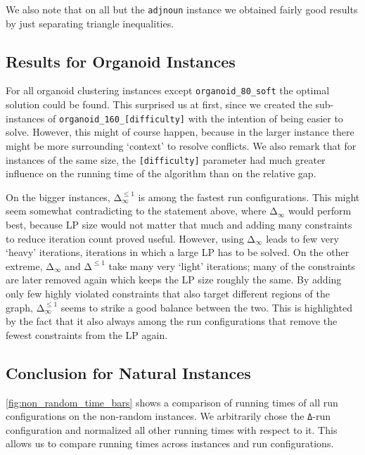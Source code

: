 We also note that on all but the \texttt{adjnoun} instance we obtained fairly good results by just separating triangle inequalities.

\subsection{Results for Organoid Instances}
For all organoid clustering instances except \texttt{organoid\_80\_soft} the optimal solution could be found.
This surprised us at first, since we created the sub-instances of \texttt{organoid\_160\_[difficulty]} with the intention of being easier to solve.
However, this might of course happen, because in the larger instance there might be more surrounding ‘context’ to resolve conflicts.
We also remark that for instances of the same size, the \texttt{[difficulty]} parameter had much greater influence on the running time of the algorithm than on the relative gap.

On the bigger instances, $\texttt{Δ}_{\infty}^{\leq 1}$ is among the fastest run configurations.
This might seem somewhat contradicting to the statement above, where $\texttt{Δ}_{\infty}$ would perform best,
because LP size would not matter that much and adding many constraints to reduce iteration count proved useful.
However, using $\texttt{Δ}_{\infty}$ leads to few very ‘heavy’ iterations, \ie iterations in which a large LP has to be solved.
On the other extreme, $\texttt{Δ}_{\infty}$ and $\texttt{Δ}^{\leq 1}$ take many very ‘light’ iterations; many of the constraints are later removed again which keeps the LP size roughly the same.
By adding only few highly violated constraints that also target different regions of the graph, $\texttt{Δ}_{\infty}^{\leq 1}$ seems to strike a good balance between the two.
This is highlighted by the fact that it also always among the run configurations that remove the fewest constraints from the LP again.

\subsection{Conclusion for Natural Instances}
\cref{fig:non_random_time_bars} shows a comparison of running times of all run configurations on the non-random instances.
We arbitrarily chose the \texttt{Δ}-run configuration and normalized all other running times with respect to it.
This allows us to compare running times across instances and run configurations.

